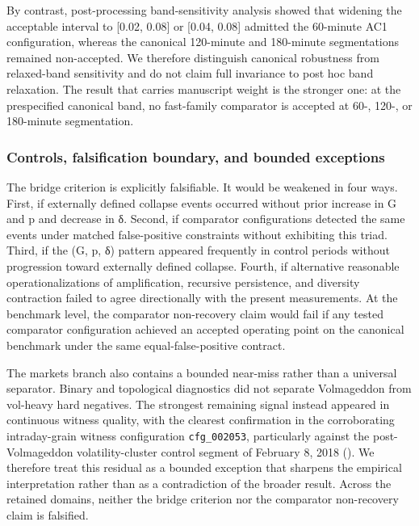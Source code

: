 \documentclass[
  11pt,
]{article}
\begin{document}
By contrast, post-processing band-sensitivity analysis showed that
widening the acceptable interval to {[}0.02, 0.08{]} or {[}0.04, 0.08{]}
admitted the 60-minute AC1 configuration, whereas the canonical
120-minute and 180-minute segmentations remained non-accepted. We
therefore distinguish canonical robustness from relaxed-band sensitivity
and do not claim full invariance to post hoc band relaxation. The result
that carries manuscript weight is the stronger one: at the prespecified
canonical band, no fast-family comparator is accepted at 60-, 120-, or
180-minute segmentation.

\subsubsection{Controls, falsification boundary, and bounded
exceptions}\label{controls-falsification-boundary-and-bounded-exceptions}

The bridge criterion is explicitly falsifiable. It would be weakened in
four ways. First, if externally defined collapse events occurred without
prior increase in G and p and decrease in δ. Second, if comparator
configurations detected the same events under matched false-positive
constraints without exhibiting this triad. Third, if the (G, p, δ)
pattern appeared frequently in control periods without progression
toward externally defined collapse. Fourth, if alternative reasonable
operationalizations of amplification, recursive persistence, and
diversity contraction failed to agree directionally with the present
measurements. At the benchmark level, the comparator non-recovery claim
would fail if any tested comparator configuration achieved an accepted
operating point on the canonical benchmark under the same
equal-false-positive contract.

The markets branch also contains a bounded near-miss rather than a
universal separator. Binary and topological diagnostics did not separate
Volmageddon from vol-heavy hard negatives. The strongest remaining
signal instead appeared in continuous witness quality, with the clearest
confirmation in the corroborating intraday-grain witness configuration
\texttt{cfg\_002053}, particularly against the post-Volmageddon
volatility-cluster control segment of February 8, 2018
(\texttt{}). We therefore treat this
residual as a bounded exception that sharpens the empirical
interpretation rather than as a contradiction of the broader result.
Across the retained domains, neither the bridge criterion nor the
comparator non-recovery claim is falsified.
\end{document}
